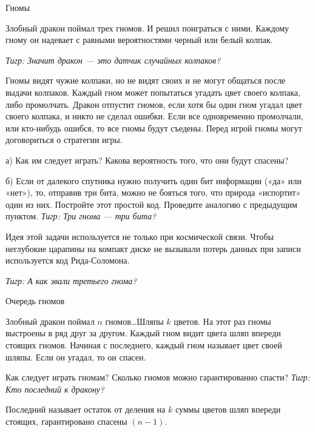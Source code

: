 \begin{problem}
 Гномы\par
Злобный дракон поймал трех гномов. И решил поиграться с ними. Каждому гному он надевает с равными вероятностями черный или белый колпак. \par
{\it Тигр: Значит дракон — это датчик случайных колпаков?} \par
Гномы видят чужие колпаки, но не видят своих и не могут общаться после выдачи колпаков. Каждый гном может попытаться угадать цвет своего колпака, либо промолчать. Дракон отпустит гномов, если хотя бы один гном угадал цвет своего колпака, и никто не сделал ошибки. Если все одновременно промолчали, или кто-нибудь ошибся, то все гномы будут съедены. Перед игрой гномы могут договориться о стратегии игры.\par
а) Как им следует играть? Какова вероятность того, что они будут спасены?\par
б) Если от далекого спутника нужно получить один бит информации («да» или «нет»), то, отправив три бита, можно не бояться того, что природа «испортит» один из них. Постройте этот простой код. Проведите аналогию с предыдущим пунктом. {\it Тигр: Три гнома — три бита?}\par
Идея этой задачи используется не только при космической связи. Чтобы неглубокие царапины на компакт диске не вызывали потерь данных при записи используется код Рида-Соломона.\par
{\it Тигр: А как звали третьего гнома?}\par



\begin{sol}

\end{sol}
\end{problem}



\begin{problem}
 Очередь гномов\par
Злобный дракон поймал  $n$  гномов\ldots Шляпы $k$ цветов. На этот раз гномы выстроены в ряд друг за другом. Каждый гном видит цвета шляп впереди стоящих гномов. Начиная с последнего, каждый гном называет цвет своей шляпы. Если он угадал, то он спасен.\par
Как следует играть гномам? Сколько гномов можно гарантированно спасти?
{\it Тигр: Кто последний к дракону?}



\begin{sol}
Последний называет остаток от деления на $k$ суммы цветов шляп впереди стоящих, гарантировано спасены $(n-1)$.
\end{sol}
\end{problem}



